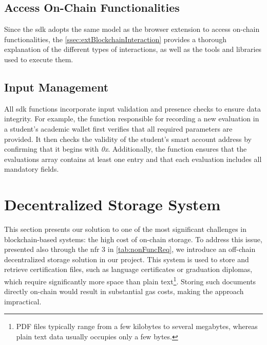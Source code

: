 

\subsection{Access On-Chain Functionalities}
Since the \gls{sdk} adopts the same model as the browser extension to access on-chain functionalities, the \cref{ssec:extBlockchainInteraction} provides a thorough explanation of the different types of interactions, as well as the tools and libraries used to execute them.

\subsection{Input Management}
All \gls{sdk} functions incorporate input validation and presence checks to ensure data integrity. For example, the function responsible for recording a new evaluation in a student's academic wallet first verifies that all required parameters are provided. It then checks the validity of the student's smart account address by confirming that it begins with \textit{0x}. Additionally, the function ensures that the evaluations array contains at least one entry and that each evaluation includes all mandatory fields.

\section{Decentralized Storage System}
\label{sec:decStorageDesgn}
This section presents our solution to one of the most significant challenges in blockchain-based systems: the high cost of on-chain storage. To address this issue, presented also through the \gls{nfr} 3 in \cref{tab:nonFuncReq}, we introduce an off-chain decentralized storage solution in our project. This system is used to store and retrieve certification files, such as language certificates or graduation diplomas, which require significantly more space than plain text\footnote{PDF files typically range from a few kilobytes to several megabytes, whereas plain text data usually occupies only a few bytes.}. Storing such documents directly on-chain would result in substantial gas costs, making the approach impractical. 

